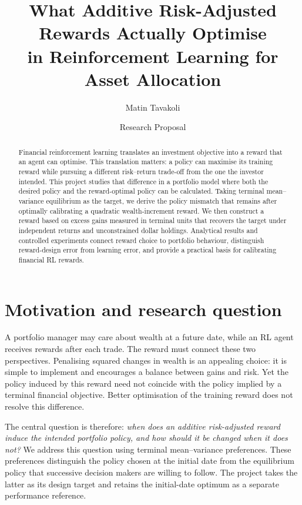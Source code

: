 \documentclass[11pt,a4paper]{article}
\title{\vspace{-1.5em}What Additive Risk-Adjusted Rewards Actually Optimise\\
in Reinforcement Learning for Asset Allocation}
\author{Matin Tavakoli}
\date{Research Proposal}
\theoremstyle{plain}
\theoremstyle{definition}
\begin{document}
\maketitle
\vspace{-1.5em}


\begin{abstract}
Financial reinforcement learning translates an investment objective into a reward that an agent can optimise. This translation matters: a policy can maximise its training reward while pursuing a different risk--return trade-off from the one the investor intended. This project studies that difference in a portfolio model where both the desired policy and the reward-optimal policy can be calculated. Taking terminal mean--variance equilibrium as the target, we derive the policy mismatch that remains after optimally calibrating a quadratic wealth-increment reward. We then construct a reward based on excess gains measured in terminal units that recovers the target under independent returns and unconstrained dollar holdings. Analytical results and controlled experiments connect reward choice to portfolio behaviour, distinguish reward-design error from learning error, and provide a practical basis for calibrating financial RL rewards.
\end{abstract}

\section{Motivation and research question}
A portfolio manager may care about wealth at a future date, while an RL agent receives rewards after each trade. The reward must connect these two perspectives. Penalising squared changes in wealth is an appealing choice: it is simple to implement and encourages a balance between gains and risk. Yet the policy induced by this reward need not coincide with the policy implied by a terminal financial objective. Better optimisation of the training reward does not resolve this difference.

The central question is therefore: \emph{when does an additive risk-adjusted reward induce the intended portfolio policy, and how should it be changed when it does not?} We address this question using terminal mean--variance preferences. These preferences distinguish the policy chosen at the initial date from the equilibrium policy that successive decision makers are willing to follow. The project takes the latter as its design target and retains the initial-date optimum as a separate performance reference.
\end{document}
